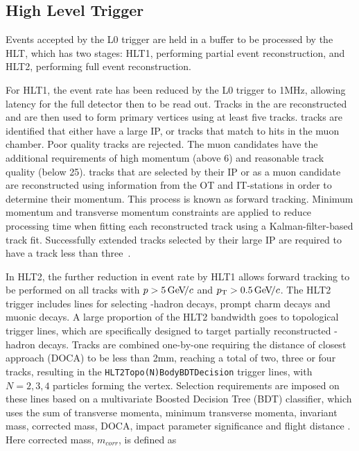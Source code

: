 \subsection{High Level Trigger}

Events accepted by the L0 trigger are held in a buffer to be processed by the HLT, which has two stages: HLT1, performing partial event reconstruction, and HLT2, performing full event reconstruction. 

For HLT1, the event rate has been reduced by the L0 trigger to 1MHz, allowing latency for the full detector then to be read out. Tracks in the \velo are reconstructed and are then used to form primary vertices using at least five tracks. \velo tracks are identified that either have a large IP, or tracks that match to hits in the muon chamber. Poor quality \velo tracks are rejected. The muon candidates have the additional requirements of high momentum (above 6\gevc) and reasonable track quality (\chisqndf below 25). \velo tracks that are selected by their IP or as a muon candidate are reconstructed using information from the OT and IT-stations in order to determine their momentum. This process is known as forward tracking. Minimum momentum and transverse momentum constraints are applied to reduce processing time when fitting each reconstructed track using a Kalman-filter-based track fit. Successfully extended \velo tracks selected by their large IP are required to have a track \chisq less than three~\cite{trigger_tim}.

In HLT2, the further reduction in event rate by HLT1 allows forward tracking to be performed on all \velo tracks with $p > 5{\mathrm{\,Ge\kern -0.1em V\!/}c}$ and $\mbox{$p_{\mathrm{ T}}$} > 0.5{\mathrm{\,Ge\kern -0.1em V\!/}c}$. The HLT2 trigger includes lines for selecting \bquark-hadron decays, prompt charm decays and muonic decays. A large proportion of the HLT2 bandwidth goes to topological trigger lines, which are specifically designed to target partially reconstructed \bquark-hadron decays. Tracks are combined one-by-one requiring the distance of closest approach (DOCA) to be less than 2mm, reaching a total of two, three or four tracks, resulting in the {\tt HLT2Topo(N)BodyBDTDecision} trigger lines, with $N = 2,3,4$ particles forming the vertex. Selection requirements are imposed on these lines based on a multivariate Boosted Decision Tree (BDT) classifier, which uses the sum of transverse momenta, minimum transverse momenta, invariant mass, corrected mass, DOCA, impact parameter significance and flight distance \chisq. Here corrected mass, $m_{corr}$, is defined as

